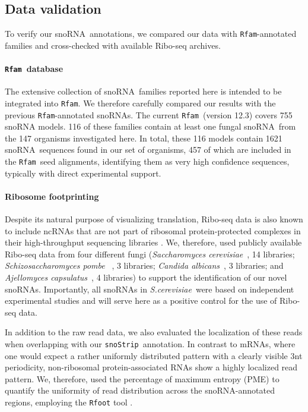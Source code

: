 \documentclass[preprint,3p,times]{elsarticle}
\newcommand{\NEW}[1]{\begingroup\color{black}#1\endgroup}
\newcommand{\sno}{snoRNA}
\newcommand{\snostrip}{\texttt{snoStrip}}
\newcommand{\rfam}{\texttt{Rfam}}
\newcommand{\Calb}{\emph{Candida albicans}}
\newcommand{\Spo}{\emph{Schizosaccharomyces pombe}}
\newcommand{\Sce}{\emph{Saccharomyces cerevisiae}}
\newcommand{\sce}{\emph{S.cerevisiae}}
\newcommand{\Aca}{\emph{Ajellomyces capsulatus}}
\begin{document}
\NEW{
\subsection{Data validation}}

\NEW{ To verify our \sno\ annotations, we compared
our data with \rfam -annotated families and cross-checked with available Ribo-seq
archives.}

\NEW{\paragraph{\rfam\ database} The extensive collection of \sno\ families reported here is intended to be
  integrated into \rfam.  We therefore carefully compared our results with
the previous \rfam -annotated \sno s. The current \rfam\ (version 12.3)
covers 755 snoRNA models. 116 of these families contain at least one fungal
\sno\ from the 147 organisms investigated here. In total, these 116 models
contain 1621 \sno\ sequences found in our set of organisms, 457 of which
are included in the \rfam\ seed alignments, identifying them as very high
confidence sequences, typically with direct experimental support. }

\NEW{\paragraph{Ribosome footprinting} Despite its natural purpose of
  visualizing translation, Ribo-seq data is also known to
  include ncRNAs that are not part of ribosomal protein-protected
  complexes in their high-throughput sequencing libraries
  \cite{Ingolia:2014, Ji:2016}. We, therefore,
    used publicly available Ribo-seq data from four different fungi
    (\Sce\ \cite{Ingolia:2009}, 14 libraries; \Spo\ \cite{Duncan:2014}
    , 3 libraries; \Calb\
    \cite{Muzzey:2014}, 3 libraries; and \Aca\ \cite{Gilmore:2015}, 4 libraries) to support the
    identification of our novel \sno s.  Importantly, all \sno s in
    \sce\ were based on independent experimental studies and will
    serve here as a positive control for the use of Ribo-seq data.

    In addition to the raw read data, we also evaluated the
    localization of these reads when overlapping with our \snostrip\
    annotation. In contrast to mRNAs, where one would expect a rather
    uniformly distributed pattern with a clearly visible 3nt
    periodicity, non-ribosomal protein-associated RNAs show a highly
    localized read pattern.  We, therefore, used the percentage of
    maximum entropy (PME) to quantify the uniformity of read
    distribution across the \sno -annotated regions, employing the
    \texttt{Rfoot} tool \cite{Ji:2016}.  }
\end{document}
